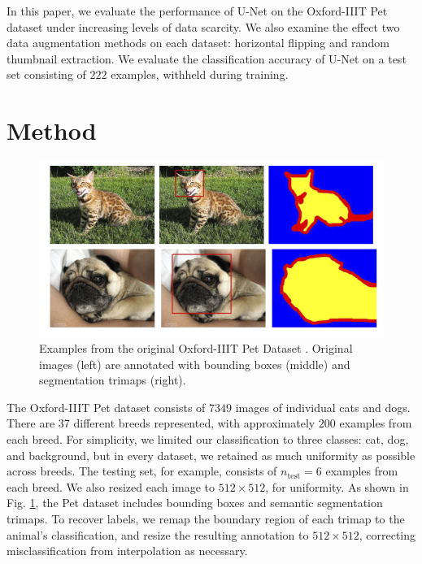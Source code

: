 \documentclass[10pt, journal]{IEEEtran}
\begin{document}
In this paper, we evaluate the performance of U-Net on the Oxford-IIIT Pet
dataset \cite{parkhi_cats_2012} under increasing levels of data scarcity. We
also examine the effect two data augmentation methods on each dataset:
horizontal flipping and random thumbnail extraction. We evaluate the
classification accuracy of U-Net on a test set consisting of $222$ examples,
withheld during training.

\section{Method}
\label{sec:method}

\begin{figure}
  \centering
  \includegraphics[width=\linewidth]{pet_annotations}
  \caption{Examples from the original Oxford-IIIT Pet Dataset
    \cite{parkhi_cats_2012}. Original images (left) are annotated with bounding
    boxes (middle) and segmentation trimaps (right).}
  \label{fig:pets}
\end{figure}

The Oxford-IIIT Pet \cite{parkhi_cats_2012} dataset consists of $7349$ images of
individual cats and dogs. There are 37 different breeds represented, with
approximately $200$ examples from each breed. For simplicity, we limited our
classification to three classes: cat, dog, and background, but in every dataset,
we retained as much uniformity as possible across breeds. The testing set, for
example, consists of $n_{\text{test}} = 6$ examples from each breed. We also
resized each image to $512 \times 512$, for uniformity. As shown in
Fig. \ref{fig:pets}, the Pet dataset includes bounding boxes and semantic
segmentation trimaps. To recover labels, we remap the boundary region of each
trimap to the animal's classification, and resize the resulting annotation to
$512\times 512$, correcting misclassification from interpolation as necessary.
\end{document}

